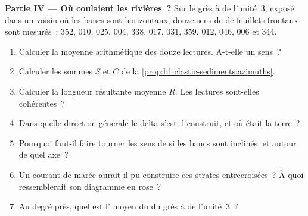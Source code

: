 \begin{problem}
\medskip
\noindent\textbf{Partie IV --- Où coulaient les rivières~?}
Sur le grès à  de l'unité~3, exposé dans un  voisin où les
bancs sont horizontaux, douze sens de  de feuillets frontaux sont mesurés~: 352, 010, 025,
004, 338, 017, 031, 359, 012, 046, 006 et 344.
\begin{enumerate}[resume]
  \item Calculer la moyenne arithmétique des douze lectures. A-t-elle un sens~?
  \item Calculer les sommes $S$ et $C$ de la \cref{prop:b1:clastic-sediments:azimuths}.
  \item Calculer la longueur résultante moyenne $\bar R$. Les lectures sont-elles
        cohérentes~?
  \item Dans quelle direction générale le delta s'est-il construit, et où était la terre~?
  \item Pourquoi faut-il faire tourner les sens de  si les bancs sont inclinés, et
        autour de quel axe~?
  \item Un courant de marée aurait-il pu construire ces strates entrecroisées~? À quoi ressemblerait son
        diagramme en rose~?
  \item Au degré près, quel est l' moyen du  du grès
        à  de l'unité~3~?
\end{enumerate}
\end{problem}
